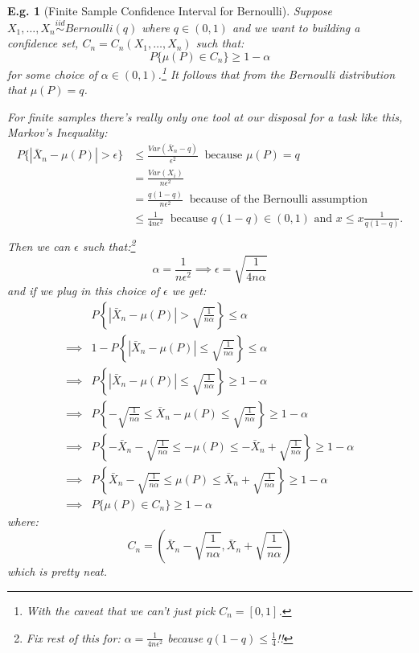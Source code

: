 \documentclass{tufte-book}
\theoremstyle{mytheoremstyle}
\theoremstyle{mylemstyle}
\theoremstyle{mydefstyle}
\newtheorem*{ex}{E.g.}
\begin{document}
\begin{ex}[Finite Sample Confidence Interval for Bernoulli] Suppose \(X_1, \dots, X_n \overset{iid}{\sim} Bernoulli(q)\) where \(q \in (0, 1)\) and we want to building a confidence set, \(C_n = C_n (X_1, \dots, X_n)\) such that:
	\[P\{\mu(P) \in C_n\} \ge 1-\alpha\]
for some choice of \(\alpha \in (0, 1)\).\footnote{With the caveat that we can't just pick \(C_n = [0, 1]\).} It follows that from the Bernoulli distribution that \(\mu(P) = q\). 

For finite samples there's really only one tool at our disposal for a task like this, Markov's Inequality:
	\begin{align*}
		P\{|\bar{X}_n - \mu(P)| > \epsilon\} & \le  \frac{Var(\bar{X}_n - q)}{\epsilon^2}\ \text{ because \(\mu(P) = q\)} \\
									& = \frac{Var(X_i)}{n \epsilon^2} \\
									& = \frac{q(1-q)}{n \epsilon^2}\ \text{ because of the Bernoulli assumption} \\
									& \le \frac{1}{4n \epsilon^2}\ \text{ because \(q(1-q) \in (0, 1)\) and \(x \le x\frac{1}{q(1-q)}\).} \\
	\end{align*}
Then we can \(\epsilon\) such that:\footnote{Fix rest of this for: \(\alpha = \frac{1}{4n\epsilon^2}\) because \(q(1-q) \le \frac{1}{4}\)!!}
	\[\alpha = \frac{1}{n\epsilon^2} \implies \epsilon = \sqrt{\frac{1}{4n\alpha}}\]
and if we plug in this choice of \(\epsilon\) we get:
	\begin{align*}
		& P\left\{|\bar{X}_n - \mu(P)| > \sqrt{\frac{1}{n\alpha}}\right\} \le \alpha \\
		\implies & 1- P\left\{|\bar{X}_n - \mu(P)| \le \sqrt{\frac{1}{n\alpha}}\right\} \le \alpha \\
		\implies & P\left\{|\bar{X}_n - \mu(P)| \le \sqrt{\frac{1}{n\alpha}}\right\} \ge 1-\alpha \\
		\implies & P\left\{-\sqrt{\frac{1}{n\alpha}} \le \bar{X}_n - \mu(P) \le \sqrt{\frac{1}{n\alpha}}\right\} \ge 1-\alpha \\
		\implies & P\left\{-\bar{X}_n -\sqrt{\frac{1}{n\alpha}} \le - \mu(P) \le -\bar{X}_n + \sqrt{\frac{1}{n\alpha}}\right\} \ge 1-\alpha \\
		\implies & P\left\{\bar{X}_n - \sqrt{\frac{1}{n\alpha}} \le \mu(P) \le \bar{X}_n + \sqrt{\frac{1}{n\alpha}}\right\} \ge 1-\alpha \\
		\implies & P\{\mu(P) \in C_n\} \ge 1- \alpha
	\end{align*}
where:
	\[C_n = \left(\bar{X}_n - \sqrt{\frac{1}{n\alpha}},\bar{X}_n + \sqrt{\frac{1}{n\alpha}}\right) \]
which is pretty neat.
\end{ex}
\end{document}
